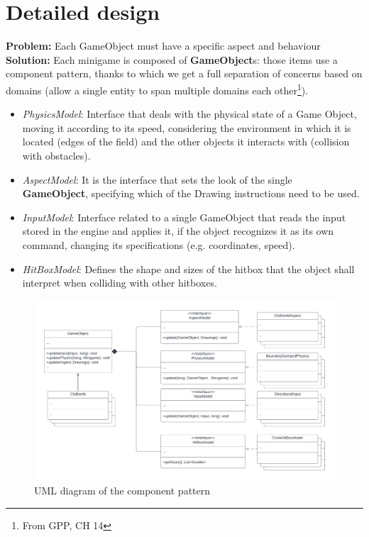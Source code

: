 \documentclass[a4paper,12pt]{report}
\begin{document}
\section{Detailed design}
\textbf{Problem:} Each GameObject must have a specific aspect and behaviour\\
\textbf{Solution:} Each minigame is composed of \textbf{GameObject}s: those items use a component pattern, thanks to which we get
a full separation of concerns based on domains (allow a single entity to span multiple domains each other\footnote{From GPP, CH 14}).
\pagebreak
\begin{itemize}
	\item \textit{PhysicsModel}: Interface that deals with the physical state of a Game Object,
	      moving it according to its speed, considering the environment in which it is located (edges of the field)
	      and the other objects it interacts with (collision with obstacles).
	\item \textit{AspectModel}: It is the interface that sets the look of the single\\ \textbf{GameObject}, specifying which of the Drawing instructions need to be used.
	\item \textit{InputModel}: Interface related to a single GameObject that reads the input stored in the
	      engine and applies it, if the object recognizes it as its own command, changing its specifications (e.g. coordinates, speed).
	\item \textit{HitBoxModel}: Defines the shape and sizes of the hitbox that the object shall interpret when colliding with other hitboxes.
\end{itemize}

\begin{figure}[ht]
	\centering{}
	\includegraphics[width=\textwidth]{res/componentPattern.pdf}
	\caption{UML diagram of the component pattern}
\end{figure}
\end{document}
